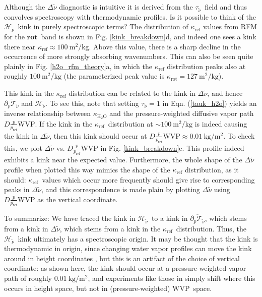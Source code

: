 \documentclass{ametsoc}
\newcommand{\eqnref}[1]{(\ref{#1})}
\newcommand{\kg}{\ensuremath{\mathrm{kg}}}
\newcommand{\meter}{\ensuremath{\mathrm{m}}}
\newcommand{\ppp}{\ensuremath{\partial_p}}
\newcommand{\htwo}{\ensuremath{\mathrm{H_2O}}}
\newcommand{\wv}{\ensuremath{\widetilde{\nu}}}
\newcommand{\trans}{\ensuremath{\mathcal{T}}}
\newcommand{\ch}{\ensuremath{\mathcal{H}}}
\newcommand{\chk}{\ensuremath{\ch_{\wv}}}
\newcommand{\tauk}{\ensuremath{\tau_{\wv}}}
\newcommand{\kapparef}{\ensuremath{\kappa_{\mathrm{ref}}}}
\newcommand{\pref}{\ensuremath{p_{\mathrm{ref}}}}
\newcommand{\WVP}{\ensuremath{\mathrm{WVP}}}
\newcommand{\kapparot}{\ensuremath{\kappa_{\mathrm{rot}}}}
\newcommand{\rot}{\ensuremath{\textbf{rot}}}
\begin{document}
Although the $\Delta \wv$ diagnostic is intuitive it is derived from the \tauk\ field and thus convolves spectroscopy with thermodynamic profiles. Is it possible to think of the \chk\ kink in purely spectroscopic terms? The distribution of $\kapparef$ values from RFM for the \rot\ band is shown in Fig. \ref{kink_breakdown}d, and indeed one sees a kink there near $\kapparef \approx 100 \ \meter^2/\kg$. Above this value, there is a sharp decline in the occurrence of more strongly absorbing wavenumbers. This can also be seen quite plainly in Fig. \ref{h2o_rfm_theory}a, in which the $\kapparef$ distribution peaks also at roughly $100 \ \meter^2/\kg$ (the parameterized peak value is $\kapparot= 127\ \meter^2/\kg$).

This kink in the $\kapparef$ distribution can be related to the kink in $\Delta \wv$, and hence $\overline{\ppp \trans_{\wv}}$ and \chk. To see this, note that setting $\tauk=1$ in Eqn. \eqnref{tauk_h2o} yields an inverse relationship between $\kappa_{\htwo}$ and the pressure-weighted diffusive vapor path $D\frac{p}{\pref} \WVP$. If the kink in the \kapparef\ distribution at $\sim100\ \meter^2/\kg$ is indeed causing the kink in $\Delta \wv$, then this kink should occur at $D\frac{p}{\pref} \WVP \approx 0.01\ \kg/\meter^2$. To check this, we plot $\Delta \wv$ vs. $D\frac{p}{\pref} \WVP$ in Fig. \ref{kink_breakdown}e. This profile indeed exhibits a kink near the expected value. Furthermore, the whole shape of the $\Delta \wv$ profile when plotted this way mimics the shape of the $\kapparef$ distribution, as it should: \kapparef\ values which occur more frequently should give rise to corresponding peaks in $\Delta \wv$, and this correspondence is made plain by plotting $\Delta \wv$ using $D\frac{p}{\pref} \WVP$ as the vertical coordinate.

To summarize: We have traced the kink in \chk\ to a kink in $\overline{\ppp \trans_{\wv}}$, which stems from a kink in $\Delta \wv$, which stems from a kink in the \kapparef\ distribution. Thus, the \chk\ kink ultimately has a spectroscopic origin. It may be thought that the kink is thermodynamic in origin, since changing water vapor profiles can move the kink around in height coordinates \citep{harrop2012}, but this is an artifact of the choice of vertical coordinate: as shown here, the kink should  occur at a pressure-weighted vapor path of roughly  $0.01\ \kg/\meter^2$, and experiments like those in \cite{harrop2012} simply shift where this occurs in height space, but not in (pressure-weighted) \WVP\ space.
\end{document}
